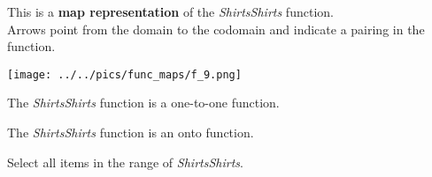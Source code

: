 \documentclass{ximera}
\author{Lee Wayand}
\begin{document}
\begin{exercise}

This is a \textbf{map representation} of the \textit{ShirtsShirts} function. \\


Arrows point from the domain to the codomain and indicate a pairing in the function.


\begin{image}
\texttt{[image: ../../pics/func\_maps/f\_9.png]}
\end{image}




\begin{question} 
The \textit{ShirtsShirts} function is a one-to-one function.

\begin{multipleChoice}
\end{multipleChoice}
\end{question}







\begin{question} 
The \textit{ShirtsShirts} function is an onto function.

\begin{multipleChoice}
\end{multipleChoice}
\end{question}







\begin{question} 

Select all items in the range of \textit{ShirtsShirts}.

\begin{selectAll}
\end{selectAll}
\end{question}












\end{exercise}
\end{document}
